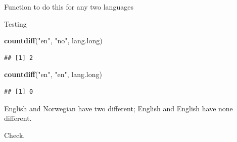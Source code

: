 \documentclass[
  ignorenonframetext,
]{beamer}
\newenvironment{Shaded}{\begin{snugshade}}{\end{snugshade}}
\newcommand{\CommentTok}[1]{\textcolor[rgb]{0.56,0.35,0.01}{\textit{#1}}}
\newcommand{\ControlFlowTok}[1]{\textcolor[rgb]{0.13,0.29,0.53}{\textbf{#1}}}
\newcommand{\DataTypeTok}[1]{\textcolor[rgb]{0.13,0.29,0.53}{#1}}
\newcommand{\DecValTok}[1]{\textcolor[rgb]{0.00,0.00,0.81}{#1}}
\newcommand{\FloatTok}[1]{\textcolor[rgb]{0.00,0.00,0.81}{#1}}
\newcommand{\KeywordTok}[1]{\textcolor[rgb]{0.13,0.29,0.53}{\textbf{#1}}}
\newcommand{\NormalTok}[1]{#1}
\newcommand{\OperatorTok}[1]{\textcolor[rgb]{0.81,0.36,0.00}{\textbf{#1}}}
\newcommand{\StringTok}[1]{\textcolor[rgb]{0.31,0.60,0.02}{#1}}
\begin{document}
\begin{frame}[fragile]{Function to do this for any two languages}
\protect\hypertarget{function-to-do-this-for-any-two-languages}{}

\begin{Shaded}
\end{Shaded}

\end{frame}

\begin{frame}[fragile]{Testing}
\protect\hypertarget{testing}{}

\begin{Shaded}
\begin{Highlighting}[]
\KeywordTok{countdiff}\NormalTok{(}\StringTok{"en"}\NormalTok{, }\StringTok{"no"}\NormalTok{, lang.long)}
\end{Highlighting}
\end{Shaded}

\begin{verbatim}
## [1] 2
\end{verbatim}

\begin{Shaded}
\begin{Highlighting}[]
\KeywordTok{countdiff}\NormalTok{(}\StringTok{"en"}\NormalTok{, }\StringTok{"en"}\NormalTok{, lang.long)}
\end{Highlighting}
\end{Shaded}

\begin{verbatim}
## [1] 0
\end{verbatim}

English and Norwegian have two different; English and English have none
different.

Check.

\end{frame}
\end{document}
